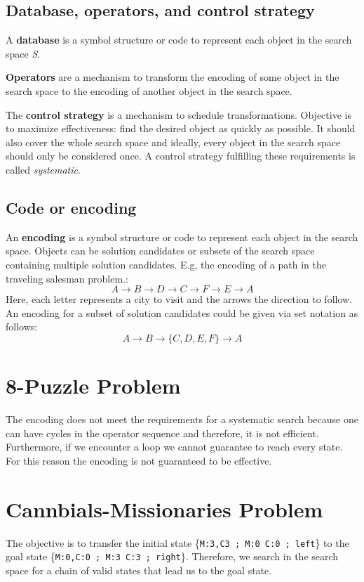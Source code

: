 \documentclass[11pt]{article}
\begin{document}
\subsection{Database, operators, and control strategy}
A \textbf{database} is a symbol structure or code to represent each object in the search space \emph{S}.

\textbf{Operators} are a mechanism to transform the encoding of some object in the search space to the encoding of another object in the search space.

The \textbf{control strategy} is a mechanism to schedule transformations. Objective is to maximize effectiveness: find the desired object as quickly as possible. It should also cover the whole search space and ideally, every object in the search space should only be considered once. A control strategy fulfilling these requirements is called \emph{systematic}. 

\subsection{Code or encoding}
An \textbf{encoding} is a symbol structure or code to represent each object in the search space. Objects can be solution candidates or subsets of the search space containing multiple solution candidates. E.g, the encoding of a path in the traveling salesman problem.:
\begin{equation*}
A \rightarrow B \rightarrow D \rightarrow C \rightarrow F \rightarrow E \rightarrow A
\end{equation*}
Here, each letter represents a city to visit and the arrows the direction to follow. An encoding for a subset of solution candidates could be given via set notation as follows:
\begin{equation*}
A \rightarrow B \rightarrow \{C,D,E,F\} \rightarrow A
\end{equation*}

\section{8-Puzzle Problem}
The encoding does not meet the requirements for a systematic search because one can have cycles in the operator sequence and therefore, it is not efficient. Furthermore, if we encounter a loop we cannot guarantee to reach every state. For this reason the encoding is not guaranteed to be effective.

\setcounter{section}{6}
\section{Cannbials-Missionaries Problem}
The objective is to transfer the initial state \{\texttt{M:3,C3 ; M:0 C:0 ; left}\} to the goal state \{\texttt{M:0,C:0 ; M:3 C:3 ; right}\}. Therefore, we search in the search space for a chain of valid states that lead us to the goal state.
\end{document}
